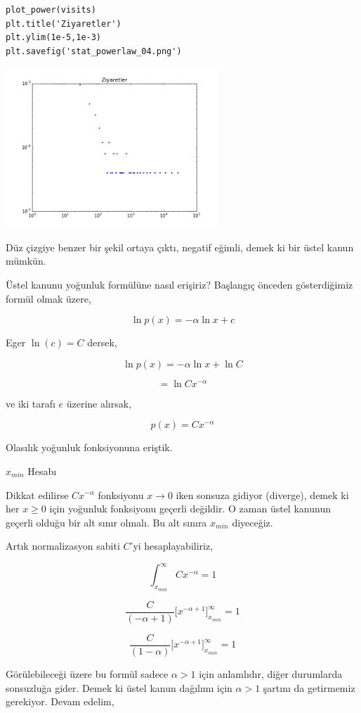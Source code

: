 \documentclass[12pt,fleqn]{article}\usepackage{../../common}
\begin{document}
\begin{verbatim}
plot_power(visits)
plt.title('Ziyaretler')
plt.ylim(1e-5,1e-3)
plt.savefig('stat_powerlaw_04.png')
\end{verbatim}

\includegraphics[height=6cm]{stat_powerlaw_04.png}

Düz çizgiye benzer bir şekil ortaya çıktı, negatif eğimli, demek ki bir
üstel kanun mümkün.

Üstel kanunu yoğunluk formülüne nasıl erişiriz? Başlangıç önceden
gösterdiğimiz formül olmak üzere,

$$ \ln p(x) = -\alpha \ln x + c $$

Eger $\ln(c) = C$ dersek, 

$$ \ln p(x) = -\alpha \ln x + \ln C $$

$$  = \ln C x^{-\alpha}  $$

ve iki tarafı $e$ üzerine alırsak,

$$ p(x) = C x^{-\alpha}  $$

Olasılık yoğunluk fonksiyonuna eriştik. 

$x_{min}$ Hesabı

Dikkat edilirse $C x^{-\alpha}$ fonksiyonu $x \to 0$ iken sonsuza gidiyor
(diverge), demek ki her $x \ge 0$ için yoğunluk fonksiyonu geçerli
değildir. O zaman üstel kanunun geçerli olduğu bir alt sınır olmalı. Bu alt
sınıra $x_{min}$ diyeceğiz.

Artık normalizasyon sabiti $C$'yi hesaplayabiliriz, 

$$ \int _{x_{min}}^{\infty} C x^{-\alpha} = 1$$

$$ \frac{C}{(-\alpha+1) } \bigg[ x^{-\alpha+1} \bigg] _{x_{min}}^{\infty} = 1$$

$$ \frac{C}{(1-\alpha) } \bigg[ x^{-\alpha+1} \bigg] _{x_{min}}^{\infty} = 1$$

Görülebileceği üzere bu formül sadece $\alpha > 1$ için anlamlıdır, diğer
durumlarda sonsuzluğa gider. Demek ki üstel kanun dağılımı 
için $\alpha > 1$ şartını da getirmemiz gerekiyor. Devam edelim,
\end{document}
